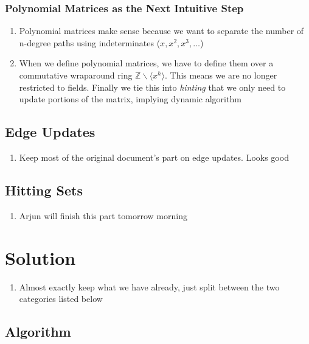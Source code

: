 \documentclass[12pt]{article}
\begin{document}
\subsubsection{Polynomial Matrices as the Next Intuitive Step}

\begin{enumerate}
    \item Polynomial matrices make sense because we want to separate the number of n-degree paths using indeterminates ($x, x^2, x^3, \ldots$)
    \item When we define polynomial matrices, we have to define them over a commutative wraparound ring $\mathds{Z} \backslash \langle x^h \rangle$. This means we are no longer restricted to fields. Finally we tie this into \emph{hinting} that we only need to update portions of the matrix, implying dynamic algorithm
\end{enumerate}

\subsection{Edge Updates}

\begin{enumerate}
    \item Keep most of the original document's part on edge updates. Looks good
\end{enumerate}

\subsection{Hitting Sets}

\begin{enumerate}
    \item Arjun will finish this part tomorrow morning
\end{enumerate}

\section{Solution}

\begin{enumerate}
    \item Almost exactly keep what we have already, just split between the two categories listed below
\end{enumerate}

\subsection{Algorithm}
\end{document}
